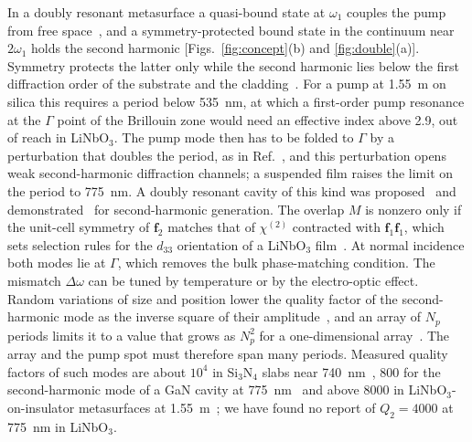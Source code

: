 \documentclass{optica-article}
\newcommand{\chitwo}{\chi^{(2)}}
\newcommand{\Dom}{\Delta\omega}
\newcommand{\f}{\mathbf f}
\begin{document}
In a doubly resonant metasurface a quasi-bound state at $\omega_1$ couples
the pump from free space~\cite{koshelev2018}, and a symmetry-protected bound
state in the continuum near $2\omega_1$ holds the second harmonic
[Figs.~\ref{fig:concept}(b) and \ref{fig:double}(a)].  Symmetry protects
the latter only while the second harmonic lies below the first diffraction
order of the substrate and the cladding~\cite{hsu2016,cerjan2021}.  For a
pump at 1.55~\textmu m on silica this requires a period below 535~nm, at
which a first-order pump resonance at the $\Gamma$ point of the Brillouin
zone would need an effective
index above 2.9, out of reach in LiNbO$_3$.  The pump mode then has to be
folded to $\Gamma$ by a perturbation that doubles the period, as in
Ref.~\cite{wang2020}, and this perturbation opens weak second-harmonic
diffraction channels; a suspended film raises the limit on the period to
775~nm.  A doubly resonant cavity of this kind was
proposed~\cite{minkov2019} and demonstrated~\cite{wang2020} for
second-harmonic generation.  The overlap $M$ is nonzero only
if the unit-cell symmetry of $\f_2$ matches that of $\chitwo$ contracted
with $\f_1\f_1$, which sets selection rules for the $d_{33}$ orientation of
a LiNbO$_3$ film~\cite{fedotova2020}.  At normal incidence both modes lie
at $\Gamma$, which removes the bulk phase-matching condition.  The mismatch
$\Dom$ can be tuned by temperature or by the electro-optic effect.
Random variations of size and position lower the quality factor of the
second-harmonic mode as the inverse square of their
amplitude~\cite{kuhne2021,maslova2021}, and an array of $N_p$ periods limits
it to a value that grows as $N_p^2$ for a one-dimensional
array~\cite{bulgakov2017}.  The array and the pump spot must therefore span
many periods.  Measured quality factors of such modes are about $10^4$ in
Si$_3$N$_4$ slabs near 740~nm~\cite{hsu2013}, 800 for the second-harmonic
mode of a GaN cavity at 775~nm~\cite{wang2020} and above 8000 in
LiNbO$_3$-on-insulator metasurfaces at 1.55~\textmu m~\cite{difrancescantonio2025};
we have found no report of $Q_2=4000$ at 775~nm in LiNbO$_3$.
\end{document}
